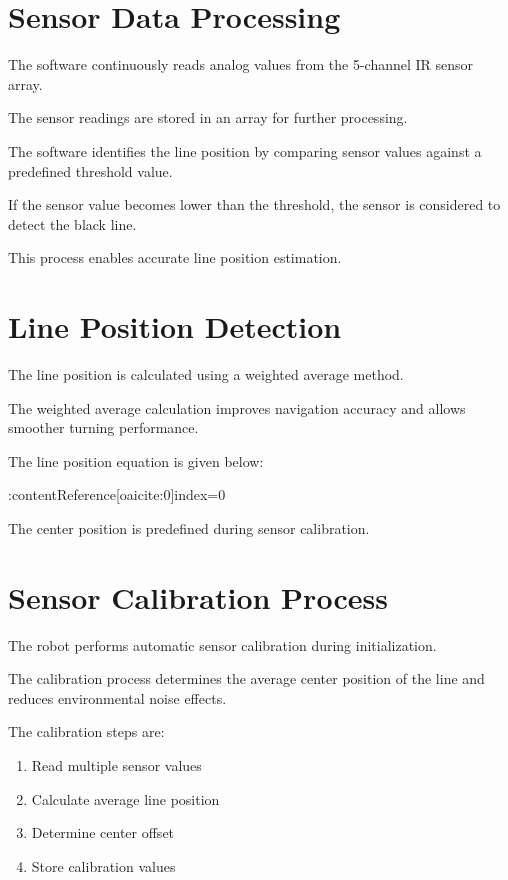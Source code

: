 \documentclass[12pt,a4paper,oneside]{report}
\begin{document}
\section{Sensor Data Processing}

The software continuously reads analog values from the 5-channel IR sensor array.

The sensor readings are stored in an array for further processing.

The software identifies the line position by comparing sensor values against a predefined threshold value.

If the sensor value becomes lower than the threshold, the sensor is considered to detect the black line.

This process enables accurate line position estimation.


\section{Line Position Detection}

The line position is calculated using a weighted average method.

The weighted average calculation improves navigation accuracy and allows smoother turning performance.

The line position equation is given below:

:contentReference[oaicite:0]{index=0}

The center position is predefined during sensor calibration.


\section{Sensor Calibration Process}

The robot performs automatic sensor calibration during initialization.

The calibration process determines the average center position of the line and reduces environmental noise effects.

The calibration steps are:

\begin{enumerate}

\item Read multiple sensor values

\item Calculate average line position

\item Determine center offset

\item Store calibration values

\end{enumerate}
\end{document}
